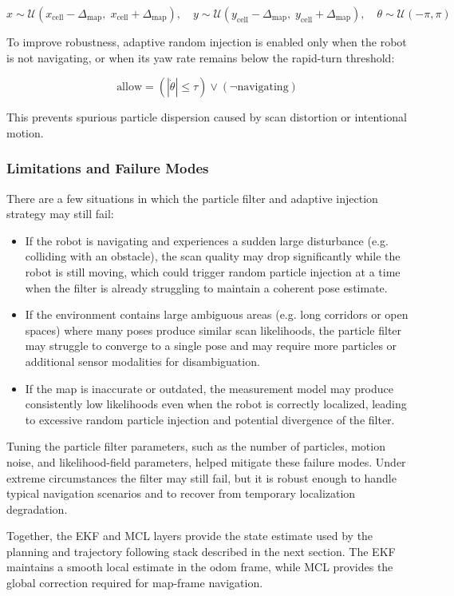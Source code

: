 \documentclass[11pt]{article}
\begin{document}
\[
x \sim \mathcal{U}(x_{\text{cell}} - \Delta_{\text{map}},\; x_{\text{cell}} + \Delta_{\text{map}}), \quad
y \sim \mathcal{U}(y_{\text{cell}} - \Delta_{\text{map}},\; y_{\text{cell}} + \Delta_{\text{map}}), \quad
\theta \sim \mathcal{U}(-\pi,\pi)
\]

\noindent To improve robustness, adaptive random injection is enabled only when the robot is not navigating, or when its
          yaw rate remains below the rapid-turn threshold:

\[
\text{allow} = (|\dot{\theta}| \le \tau) \lor (\neg \text{navigating})
\]

\noindent This prevents spurious particle dispersion caused by scan distortion or intentional motion.
\subsubsection{Limitations and Failure Modes}
There are a few situations in which the particle filter and adaptive injection strategy may still fail:
\begin{itemize}
    \item If the robot is navigating and experiences a sudden large disturbance (e.g. colliding with an obstacle), the
          scan quality may drop significantly while the robot is still moving, which could trigger random particle
          injection at a time when the filter is already struggling to maintain a coherent pose estimate.
    \item If the environment contains large ambiguous areas (e.g. long corridors or open spaces) where many poses
          produce similar scan likelihoods, the particle filter may struggle to converge to a single pose and may
          require more particles or additional sensor modalities for disambiguation.
    \item If the map is inaccurate or outdated, the measurement model may produce consistently low likelihoods even when
          the robot is correctly localized, leading to excessive random particle injection and potential divergence of
          the filter.
\end{itemize}
Tuning the particle filter parameters, such as the number of particles, motion noise, and likelihood-field parameters,
helped mitigate these failure modes. Under extreme circumstances the filter may still fail, but it is robust enough to
handle typical navigation scenarios and to recover from temporary localization degradation.

\noindent Together, the EKF and MCL layers provide the state estimate used by the planning and trajectory following stack
          described in the next section. The EKF maintains a smooth local estimate in the odom frame, while MCL provides
          the global correction required for map-frame navigation.
\end{document}
